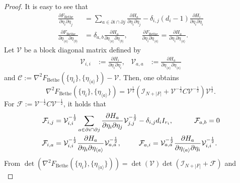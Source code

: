 \documentclass[a4paper,10pt,twoside,twocolumn,openany,final]{memoir}
\theoremstyle{plain}
\theoremstyle{definition}
\theoremstyle{remark}
\begin{document}
\begin{proof}
It is easy to see that
\begin{align*}
\frac{\partial F_\mathrm{Bethe}}{\partial \eta_i\partial \eta_j} &= 
\sum_{a\in \partial i \cap \partial j} \frac{\partial H_a}{\partial \eta_i\partial \eta_j}
- \delta_{i,j}(d_i-1) \frac{\partial H_i}{\partial \eta_i\partial \eta_i}\\
\frac{\partial F_\mathrm{Bethe}}{\partial \eta_{\langle a\rangle}\partial \eta_{\langle b\rangle}} &= 
\delta_{a,b} \frac{\partial H_a}{\partial \eta_{\langle a\rangle}\partial \eta_{\langle b\rangle}}, \qquad
\frac{\partial F_\mathrm{Bethe}}{\partial \eta_i\partial \eta_{\langle a\rangle}} = 
\frac{\partial H_a}{\partial \eta_i \partial \eta_{\langle a\rangle}}.
\end{align*}
Let $\mathcal{V}$ be a block diagonal matrix defined by
\begin{align*}
\mathcal{V}_{i,i} &:= \frac{\partial H_i}{\partial \eta_i\partial \eta_i},&
\mathcal{V}_{a,a} &:= \frac{\partial H_a}{\partial \eta_{\langle a\rangle}\partial \eta_{\langle a\rangle}}
\end{align*}
and $\mathcal{C}:= \nabla^2 F_\mathrm{Bethe}(\{\eta_i\}, \{\eta_{\langle a\rangle}\}) - \mathcal{V}$.
Then, one obtains
\begin{equation*}
\nabla^2 F_\mathrm{Bethe}(\{\eta_i\}, \{\eta_{\langle a\rangle}\})
= \mathcal{V}^{\frac12}(\mathcal{I}_{N+|F|} + \mathcal{V}^{-\frac12} C\mathcal{V}^{-\frac12})\mathcal{V}^{\frac12}.
\end{equation*}
For $\mathcal{F}:=\mathcal{V}^{-\frac12} C\mathcal{V}^{-\frac12}$, it holds that
\begin{align*}
\mathcal{F}_{i,j} &= \mathcal{V}_{i,i}^{-\frac12}\sum_{a\in\partial i \cap \partial j} 
\frac{\partial H_a}{\partial \eta_i\partial \eta_j}\mathcal{V}_{j,j}^{-\frac12} - \delta_{i,j} d_i I_{r_i},\hspace{3em}
\mathcal{F}_{a,b} = 0\\
\mathcal{F}_{i,a} &= 
\mathcal{V}_{i,i}^{-\frac12} \frac{\partial H_a}{\partial \eta_i\partial \eta_{\langle a\rangle}}\mathcal{V}_{a,a}^{-\frac12},
\hspace{2.5em}
\mathcal{F}_{a,i} = 
\mathcal{V}_{a,a}^{-\frac12} \frac{\partial H_a}{\partial \eta_{\langle a\rangle}\partial \eta_i}\mathcal{V}_{i,i}^{-\frac12}.
\end{align*}
From
$\det(\nabla^2 F_\mathrm{Bethe}(\{\eta_i\}, \{\eta_{\langle a\rangle}\})) = \det(\mathcal{V}) \det(\mathcal{I}_{N+|F|} + \mathcal{F})$
and
\begin{equation*}

\end{equation*}
\end{proof}
\end{document}
